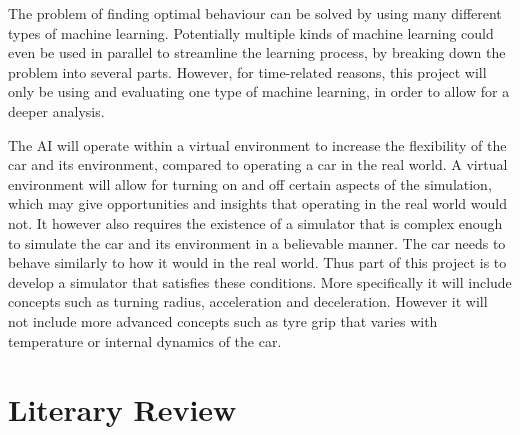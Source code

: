 The problem of finding optimal behaviour can be solved by using many different types of machine learning. Potentially multiple kinds of machine learning could even be used in parallel to streamline the learning process, by breaking down the problem into several parts. However, for time-related reasons, this project will only be using and evaluating one type of machine learning, in order to allow for a deeper analysis.

The AI will operate within a virtual environment to increase the flexibility of the car and its environment, compared to operating a car in the real world. A virtual environment will allow for turning on and off certain aspects of the simulation, which may give opportunities and insights that operating in the real world would not. It however also requires the existence of a simulator that is complex enough to simulate the car and its environment in a believable manner. The car needs to behave similarly to how it would in the real world. Thus part of this project is to develop a simulator that satisfies these conditions. More specifically it will include concepts such as turning radius, acceleration and deceleration. However it will not include more advanced concepts such as tyre grip that varies with temperature or internal dynamics of the car.




\section{Literary Review}
